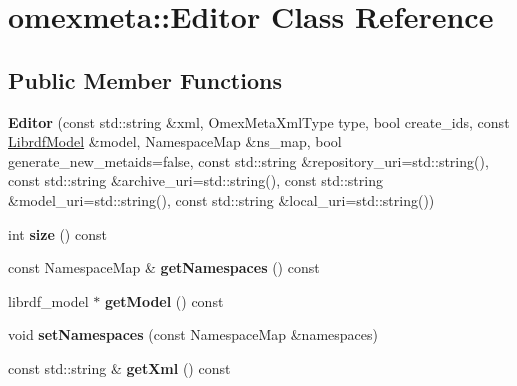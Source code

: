 \hypertarget{classomexmeta_1_1Editor}{}\section{omexmeta\+:\+:Editor Class Reference}
\label{classomexmeta_1_1Editor}
\subsection*{Public Member Functions}
\begin{DoxyCompactItemize}
\item 
\mbox{\label{classomexmeta_1_1Editor_a8cbc42e461bf7a1495c7de82882de826}} 
{\bfseries Editor} (const std\+::string \&xml, Omex\+Meta\+Xml\+Type type, bool create\+\_\+ids, const \hyperlink{classredland_1_1LibrdfModel}{Librdf\+Model} \&model, Namespace\+Map \&ns\+\_\+map, bool generate\+\_\+new\+\_\+metaids=false, const std\+::string \&repository\+\_\+uri=std\+::string(), const std\+::string \&archive\+\_\+uri=std\+::string(), const std\+::string \&model\+\_\+uri=std\+::string(), const std\+::string \&local\+\_\+uri=std\+::string())
\item 
\mbox{\label{classomexmeta_1_1Editor_ab5b39f1f137312ce77575e73a86dfb05}} 
int {\bfseries size} () const
\item 
\mbox{\label{classomexmeta_1_1Editor_a514443fe99a6e52154d1fe4f7ec94618}} 
const Namespace\+Map \& {\bfseries get\+Namespaces} () const
\item 
\mbox{\label{classomexmeta_1_1Editor_a4b2610fb802eb306349d69ae6fde60c0}} 
librdf\+\_\+model $\ast$ {\bfseries get\+Model} () const
\item 
\mbox{\label{classomexmeta_1_1Editor_a83836e19bb1de9c7df69d36e8b61b2b2}} 
void {\bfseries set\+Namespaces} (const Namespace\+Map \&namespaces)
\item 
\mbox{\label{classomexmeta_1_1Editor_ad931e829fc9f78717e0c1443c619b7d3}} 
const std\+::string \& {\bfseries get\+Xml} () const
\item 
\mbox{\label{classomexmeta_1_1Editor_a242c86222e1aeff337d3af22641db1de}} 

\end{DoxyCompactItemize}
